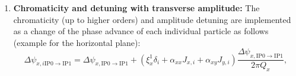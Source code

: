 {\begin{enumerate}
    The phase advance, for each segment equals:
    \begin{equation}\label{eq:phase_advance_smooth_approximation}
        \Delta \psi_{u, \mathrm{IP0 \to IP1 }} = Q_u \frac{L}{C},
    \end{equation}
    where $Q_u$ is the transverse betatron tune, $C$ the machine circumference and $L$ the length of the corresponding segment. It should be noted that if no detuning source is added (see next step) the matrix $M$ is the same for all particles.
    \item \textbf{Chromaticity and detuning with transverse amplitude:} The chromaticity (up to higher orders) and amplitude detuning are implemented as a change of the phase advance of each individual particle as follows (example for the horizontal plane):
    \begin{equation}\label{eq:change_phase_advance_detunign}
        \Delta \psi_{x, i \mathrm{IP0 \to IP1 }} = \Delta \psi_{x, \mathrm{IP0 \to IP1 }} + (\xi^{1}_x \delta_i + \alpha_{xx}J_{x, i} + \alpha_{xy}J_{y,i}) \frac{\Delta \psi_{x, \mathrm{IP0 \to IP1 }}}{2\pi Q_x}, 

\end{equation}
\end{enumerate}}
